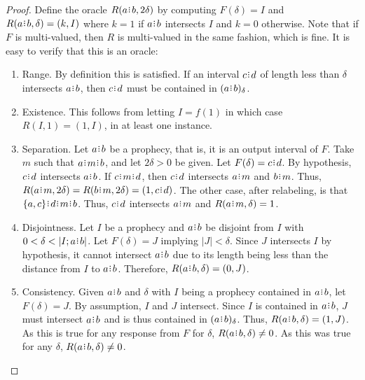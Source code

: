 \documentclass[12pt]{article}
\begin{document}
\begin{proof}
    
    Define the oracle $R(a\rint b, 2\delta)$ by computing $F(\delta) = I$ and $R(a \rint b, \delta) = (k, I)$ where $k=1$ if $a \rint b$ intersects $I$ and $k=0$ otherwise.  Note that if $F$ is multi-valued, then $R$ is multi-valued in the same fashion, which is fine. It is easy to verify that this is an oracle:

\begin{enumerate}
    \item Range. By definition this is satisfied.  If an interval $c\rint d$ of length less than $\delta$ intersects $a\rint b$, then $c\rint d$ must be contained in $\halo{a\rint b}$.
    
    \item Existence. This follows from letting $I=f(1)$ in which case $R(I, 1) = (1, I)$, in at least one instance. 
    
    \item Separation. Let $a\rint b$ be a prophecy, that is, it is an output interval of $F$. Take $m$ such that $a\rint m\rint b$, and let $2\delta > 0$ be given. Let $F(\delta)= c\rint d$. By hypothesis, $c\rint d$ intersects $a\rint b$. If $c\rint m\rint d$, then $c\rint d$ intersects $a\rint m$ and $b\rint m$. Thus, $R(a\rint m, 2 \delta) = R(b\rint m, 2\delta) = (1, c\rint d)$. The other case, after relabeling, is that $\{a, c\}\rint d\rint m\rint b$. Thus, $c\rint d$ intersects $a\rint m$ and $R(a\rint m, \delta) = 1$. 
    
    \item Disjointness. Let $I$ be a prophecy and $a\rint b$ be disjoint from $I$ with $0 < \delta < |I; a\rint b|$. Let $F(\delta) = J$ implying $|J| < \delta$. Since $J$ intersects $I$ by hypothesis, it cannot intersect $a\rint b$ due to its length being less than the distance from $I$ to $a\rint b$. Therefore, $R(a\rint b, \delta) = (0, J)$. 
    
    \item Consistency. Given $a\rint b$ and $\delta$ with $I$ being a prophecy contained in $a\rint b$, let $F(\delta)= J$. By assumption, $I$ and $J$ intersect. Since $I$ is contained in $a\rint b$, $J$ must intersect $a\rint b$ and is thus contained in $\halo{a \rint b}$. Thus, $R(a\rint b, \delta) = (1, J)$. As this is true for any response from $F$ for $\delta$, $R(a\rint b, \delta) \neq 0$. As this was true for any $\delta$, $R(a\rint b, \delta) \neq 0$. 
    

\end{enumerate}
\end{proof}
\end{document}
